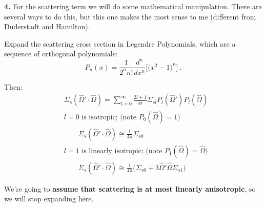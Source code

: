 \documentclass[12pt]{article}
\newcommand{\vOmega}{\ensuremath{\hat{\Omega}}}
\begin{document}

%
%

\textbf{4.} For the scattering term we will do some mathematical manipulation. There are several ways to do this, but this one makes the most sense to me (different from Duderstadt and Hamilton).

Expand the scattering cross section in Legendre Polynomials, which are a sequence of orthogonal polynomials:
%
\[P_n(x) = \frac{1}{2^n n!}\frac{d^n}{dx^n} \bigl[\bigl( x^2 -1 \bigr)^n\bigr] \:.\]

Then:
\begin{align*}
&\Sigma_s(\vOmega' \cdot \vOmega) = \sum_{l=0}^{\infty} \frac{2l+1}{4\pi} \Sigma_{sl} P_l(\vOmega')P_l(\vOmega) \\
%
&l=0 \text{ is isotropic; (note } P_0 (\vOmega) = 1 \text{)}\\
&\qquad \Sigma_s(\vOmega' \cdot \vOmega) \cong \frac{1}{4\pi}\Sigma_{s0} \\
%
&l=1 \text{ is linearly isotropic; (note } P_1 (\vOmega) = \vOmega \text{)}\\
&\qquad \Sigma_s(\vOmega' \cdot \vOmega) \cong \frac{1}{4\pi}\bigl( \Sigma_{s0} + 3\vOmega' \vOmega \Sigma_{s1} \bigr) 
\end{align*}

We're going to \textbf{assume that scattering is at most linearly anisotropic}, so we will stop expanding here.
\end{document}
